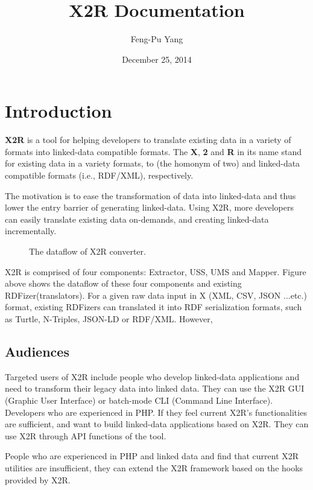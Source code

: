 \documentclass[letterpaper,10pt,english]{sphinxmanual}
\title{X2R Documentation}
\date{December 25, 2014}
\author{Feng-Pu Yang}
\begin{document}
\maketitle
\tableofcontents
{}\label{index::doc}



\chapter{Introduction}
\label{index:introduction}\label{index:welcome-to-x2r-document}
\textbf{X2R} is a tool for helping developers to translate existing data in a variety of formats into linked-data compatible formats. The \textbf{X}, \textbf{2} and \textbf{R} in its name stand for existing data in a variety formats, to (the homonym of two) and linked-data compatible formats (i.e., RDF/XML), respectively.

The motivation is to ease the transformation of data into linked-data and thus lower the entry barrier of generating linked-data. Using X2R, more developers can easily translate existing data on-demands, and creating linked-data incrementally.
\begin{figure}[htbp]
\centering
\capstart

\caption{The dataflow of X2R converter.}\end{figure}

X2R is comprised of four components: Extractor, USS, UMS and Mapper. Figure above shows the dataflow of these four components and existing RDFizer(translators). For a given raw data input in X (XML, CSV, JSON ...etc.) format, existing RDFizers can translated it into RDF serialization formats, such as Turtle, N-Triples, JSON-LD or RDF/XML. However,


\section{Audiences}
\label{docs/audience:audiences}\label{docs/audience::doc}
Targeted users of X2R include people who develop linked-data applications and need to transform their legacy data into linked data. They can use the X2R GUI (Graphic User Interface) or batch-mode CLI (Command Line Interface). Developers who are experienced in PHP. If they feel current X2R's functionalities are sufficient, and want to build linked-data applications based on X2R. They can use X2R through API functions of the tool.

People who are experienced in PHP and linked data and find that current X2R utilities are insufficient, they can extend the X2R framework based on the hooks provided by X2R.
\end{document}
